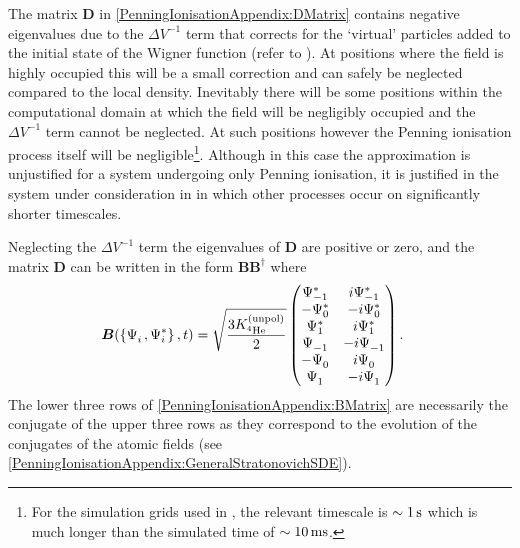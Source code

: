 The matrix $\bm{D}$ in \eqref{PenningIonisationAppendix:DMatrix} contains negative eigenvalues due to the $\Delta V^{-1}$ term that corrects for the `virtual' particles added to the initial state of the Wigner function (refer to ). At positions where the field is highly occupied this will be a small correction and can safely be neglected compared to the local density. Inevitably there will be some positions within the computational domain at which the field will be negligibly occupied and the $\Delta V^{-1}$ term cannot be neglected. At such positions however the Penning ionisation process itself will be negligible\footnote{For the simulation grids used in , the relevant timescale is $\sim \unit[1]{s}$ which is much longer than the simulated time of $\sim \unit[10]{ms}$.}. Although in this case the approximation is unjustified for a system undergoing only Penning ionisation, it is justified in the system under consideration in  in which other processes occur on significantly shorter timescales.

Neglecting the $\Delta V^{-1}$ term the eigenvalues of $\bm{D}$ are positive or zero, and the matrix $\bm{D}$ can be written in the form $\bm{B}\bm{B}^\dagger$ where
\begin{align}
    \bm{B}(\left\{\Psi_i^{\phantom{*}}, \Psi_i^*\right\}, t) &= \sqrt{\frac{3 \Kunpol}{2}}
    \begin{pmatrix}
        \Psi_{-1}^* & i \Psi_{-1}^* \\
        -\Psi_0^* & -i \Psi_0^* \\
        \Psi_1^* & i \Psi_1^* \\
        \Psi_{-1}^{\phantom{*}} & -i \Psi_{-1}^{\phantom{*}} \\
        -\Psi_0^{\phantom{*}} & i \Psi_0^{\phantom{*}} \\
        \Psi_{1}^{\phantom{*}} & -i \Psi_{1}^{\phantom{*}}
    \end{pmatrix}.
    \label{PenningIonisationAppendix:BMatrix}
\end{align}
The lower three rows of \eqref{PenningIonisationAppendix:BMatrix} are necessarily the conjugate of the upper three rows as they correspond to the evolution of the conjugates of the atomic fields (see \eqref{PenningIonisationAppendix:GeneralStratonovichSDE}).

